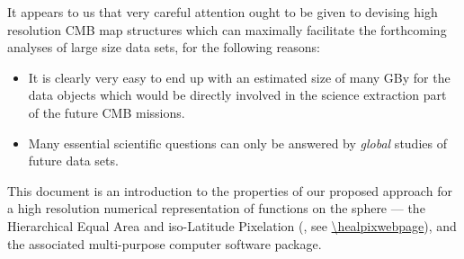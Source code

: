 \documentclass[12pt,twoside]{article}
\newcommand{\npix}{N_{\mathrm{pix}}}
\begin{document}


It appears to us that very careful
attention ought to be given to devising  high resolution CMB map
structures which can maximally facilitate 
the forthcoming analyses of large size data sets, for the following
reasons:
\begin{itemize}
\item It is clearly very easy to end up with an estimated size of many GBy 
for the 
data objects which would be directly involved in the science extraction
part of the future CMB missions.
\item Many essential scientific questions
can only be answered by {\em global} studies of  future data sets.
\end{itemize}

This document is an introduction to the
properties of our proposed approach for a high resolution numerical
representation of  functions on the sphere
 --- the Hierarchical
Equal Area and iso-Latitude Pixelation  (\healpixns, see 
\url{\healpixwebpage}), 
and the associated multi-purpose computer 
software package. 
 
\end{document}

